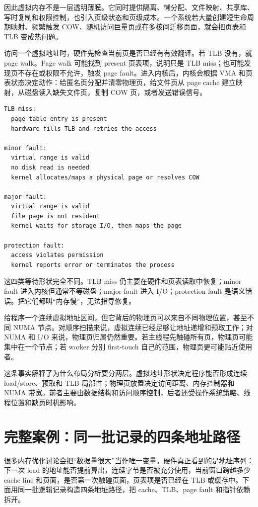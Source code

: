 因此虚拟内存不是一层透明薄膜。它同时提供隔离、懒分配、文件映射、共享库、写时复制和权限控制，也引入页级状态和页级成本。一个系统若大量创建短生命周期映射、频繁触发 COW、随机访问巨量页或在多核间迁移页面，就会把页表和 TLB 变成热问题。

访问一个虚拟地址时，硬件先检查当前页是否已经有有效翻译。若 TLB 没有，就 page walk。Page walk 可能找到 present 页表项，说明只是 TLB miss；也可能发现页不存在或权限不允许，触发 page fault。进入内核后，内核会根据 VMA 和页表状态决定动作：给匿名页分配并清零物理页，给文件页从 page cache 建立映射，从磁盘读入缺失文件页，复制 COW 页，或者发送错误信号。

\begin{lstlisting}[numbers=none,caption={从页表状态到缺页处理的分类}]
TLB miss:
  page table entry is present
  hardware fills TLB and retries the access

minor fault:
  virtual range is valid
  no disk read is needed
  kernel allocates/maps a physical page or resolves COW

major fault:
  virtual range is valid
  file page is not resident
  kernel waits for storage I/O, then maps the page

protection fault:
  access violates permission
  kernel reports error or terminates the process
\end{lstlisting}

这四类等待形状完全不同。TLB miss 仍主要在硬件和页表读取中恢复；minor fault 进入内核但通常不等磁盘；major fault 进入 I/O；protection fault 是语义错误。把它们都叫“内存慢”，无法指导修复。

 给程序一个连续虚拟地址区间，但它背后的物理页可以来自不同物理位置，甚至不同 NUMA 节点。对顺序扫描来说，虚拟连续已经足够让地址递增和预取工作；对 NUMA 和 I/O 来说，物理页归属仍然重要。若主线程先触碰所有页，物理页可能集中在一个节点；若 worker 分别 first-touch 自己的范围，物理页更可能贴近使用者。

这条事实解释了为什么布局分析要分两层。虚拟地址形状决定程序能否形成连续 load/store、预取和 TLB 局部性；物理页放置决定访问距离、内存控制器和 NUMA 带宽。前者主要由数据结构和访问顺序控制，后者还受操作系统策略、线程位置和缺页时机影响。

\section{完整案例：同一批记录的四条地址路径}

很多内存优化讨论会把“数据量很大”当作唯一变量。硬件真正看到的是地址序列：下一次 load 的地址能否提前算出，连续字节是否被充分使用，当前窗口跨越多少 cache line 和页面，是否第一次触碰页面，页表项是否已经在 TLB 或缓存中。下面用同一批逻辑记录构造四条地址路径，把 cache、TLB、page fault 和指针依赖拆开。

